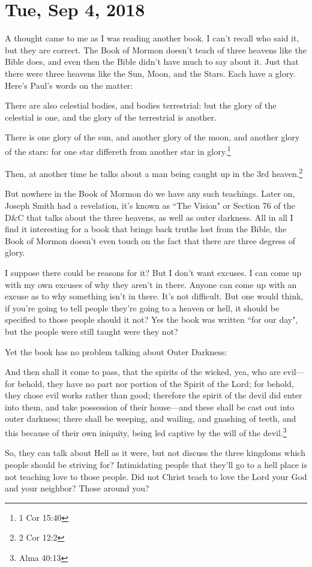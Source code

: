 \section{Tue, Sep 4, 2018}

A thought came to me as I was reading another book. I can't recall who said it, but
they are correct. The Book of Mormon doesn't teach of three heavens like the Bible
does, and even then the Bible didn't have much to say about it. Just that there were
three heavens like the Sun, Moon, and the Stars. Each have a glory. Here's Paul's
words on the matter:

\begin{displayquote}
There are also celestial bodies, and bodies terrestrial: but the glory of the 
celestial is one, and the glory of the terrestrial is another.

There is one glory of the sun, and another glory of the moon, and another glory of 
the stars: for one star differeth from another star in glory.\footnote{1 Cor 15:40}
\end{displayquote}

Then, at another time he talks about a man being caught up in the 3rd
heaven.\footnote{2 Cor 12:2}

But nowhere in the Book of Mormon do we have any such teachings. Later on, Joseph
Smith had a revelation, it's known as ``The Vision" or Section 76 of the D\&C that
talks about the three heavens, as well as outer darkness. All in all I find it
interesting for a book that brings back truths lost from the Bible, the Book of
Mormon doesn't even touch on the fact that there are three degress of glory.

I suppose there could be reasons for it? But I don't want excuses. I can come up with
my own excuses of why they aren't in there. Anyone can come up with an excuse as to
why something isn't in there. It's not difficult. But one would think, if you're
going to tell people they're going to a heaven or hell, it should be specified to
those people should it not? Yes the book was written ``for our day", but the people
were still taught were they not?

Yet the book has no problem talking about Outer Darkness:

\begin{displayquote}
And then shall it come to pass, that the spirits of the wicked, yea, who are 
evil—for behold, they have no part nor portion of the Spirit of the Lord; for 
behold, they chose evil works rather than good; therefore the spirit of the devil 
did enter into them, and take possession of their house—and these shall be cast out 
into outer darkness; there shall be weeping, and wailing, and gnashing of teeth, 
and this because of their own iniquity, being led captive by the will of the 
devil.\footnote{Alma 40:13}
\end{displayquote}

So, they can talk about Hell as it were, but not discuss the three kingdoms which
people should be striving for? Intimidating people that they'll go to a hell place 
is not teaching love to those people. Did not Christ teach to love the Lord your God
and your neighbor? Those around you?